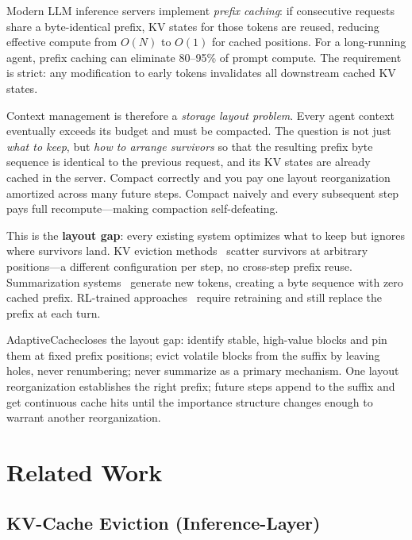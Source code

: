 \documentclass[letterpaper,twocolumn,10pt]{article}
\newcommand{\sysname}{AdaptiveCache}
\begin{document}
Modern LLM inference servers implement \emph{prefix caching}: if consecutive
requests share a byte-identical prefix, KV states for those tokens are reused,
reducing effective compute from $O(N)$ to $O(1)$ for cached positions. For a
long-running agent, prefix caching can eliminate 80--95\% of prompt compute.
The requirement is strict: any modification to early tokens invalidates all
downstream cached KV states.

Context management is therefore a \emph{storage layout problem}. Every
agent context eventually exceeds its budget and must be compacted. The
question is not just \emph{what to keep}, but \emph{how to arrange survivors}
so that the resulting prefix byte sequence is identical to the previous
request, and its KV states are already cached in the server. Compact
correctly and you pay one layout reorganization amortized across many
future steps. Compact naively and every subsequent step pays full
recompute---making compaction self-defeating.

This is the \textbf{layout gap}: every existing system optimizes what to
keep but ignores where survivors land. KV eviction
methods~\cite{zhang2023h2o,xiao2024streamingllm,li2024snapkv,
liu2023scissorhands,cai2024pyramidkv} scatter survivors at arbitrary
positions---a different configuration per step, no cross-step prefix reuse.
Summarization systems~\cite{wu2025resum,lu2025supo,openhands2025}
generate new tokens, creating a byte sequence with zero cached prefix.
RL-trained approaches~\cite{zhou2025mem1,yu2025memagent,sun2025contextfolding}
require retraining and still replace the prefix at each turn.

\sysname closes the layout gap: identify stable, high-value blocks and pin
them at fixed prefix positions; evict volatile blocks from the suffix by
leaving holes, never renumbering; never summarize as a primary mechanism.
One layout reorganization establishes the right prefix; future steps append
to the suffix and get continuous cache hits until the importance structure
changes enough to warrant another reorganization.

\section{Related Work}
\label{sec:related}

\subsection{KV-Cache Eviction (Inference-Layer)}
\end{document}
